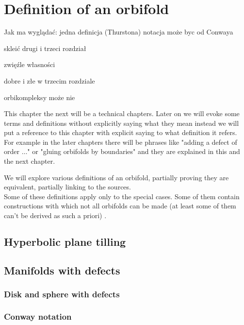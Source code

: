 \chapter{Definition of an orbifold}

Jak ma wyglądać:
jedna definicja (Thurstona)
notacja może byc od Conwaya

skleić drugi i trzeci rozdział

zwięźle własności


dobre i złe w trzecim rozdziale 

orbikompleksy może nie


This chapter the next will be a technical chapters. Later on we will evoke some terms and 
definitions without 
explicitly saying what they mean instead we will put a reference to this chapter with explicit 
saying to what definition it refers. \\
For example in the later chapters there will be phrases like "adding a defect of order $\dots$" or 
"gluing orbifolds by boundaries" and they are explained in this and the next chapter.
 

We will explore various definitions of an orbifold, partially proving they are equivalent, partially 
linking to the sources. \\
Some of these definitions apply only to the special cases. Some of them contain constructions 
with which not all orbifolds can be made (at least some of them can't be derived as such a priori)
. \\

\section{Hyperbolic plane tilling}

\section{Manifolds with defects}
\subsection{Disk and sphere with defects}\label{Disk_and_sphere_with_defects}



\subsection{Conway notation}
\cite{Conway2008}

